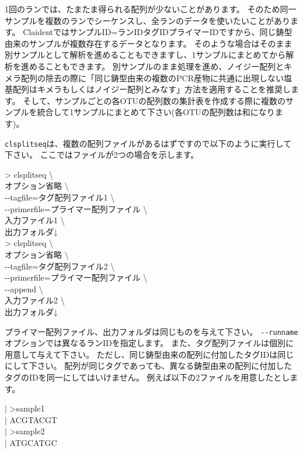 \documentclass[titlepage,10pt,a4paper]{jsbook}
\newenvironment{content}{\begin{shaded}\vspace{-1em}\raggedright\ttfamily\footnotesize\setlength{\baselineskip}{1.4em}}{\end{shaded}\vspace{-1em}}
\newenvironment{cmd}{\begin{oframed}\raggedright\ttfamily\footnotesize\setlength{\baselineskip}{1.4em}}{\end{oframed}\vspace{-1em}}
\begin{document}
1回のランでは、たまたま得られる配列が少ないことがあります。
そのため同一サンプルを複数のランでシーケンスし、全ランのデータを使いたいことがあります。
ClaidentではサンプルID=ランID{\textunderscore}{\textunderscore}タグID{\textunderscore}{\textunderscore}プライマーIDですから、同じ鋳型由来のサンプルが複数存在するデータとなります。
そのような場合はそのまま別サンプルとして解析を進めることもできますし、1サンプルにまとめてから解析を進めることもできます。
別サンプルのまま処理を進め、ノイジー配列とキメラ配列の除去の際に「同じ鋳型由来の複数のPCR産物に共通に出現しない塩基配列はキメラもしくはノイジー配列とみなす」方法を適用することを推奨します。
そして、サンプルごとの各OTUの配列数の集計表を作成する際に複数のサンプルを統合して1サンプルにまとめて下さい(各OTUの配列数は和になります)。

\texttt{clsplitseq}は、複数の配列ファイルがあるはずですので以下のように実行して下さい。
ここではファイルが2つの場合を示します。

\begin{cmd}
{\textgreater} clsplitseq {\textbackslash}\\
オプション省略 {\textbackslash}\\
{-}{-}tagfile=タグ配列ファイル1 {\textbackslash}\\
{-}{-}primerfile=プライマー配列ファイル {\textbackslash}\\
入力ファイル1 {\textbackslash}\\
出力フォルダ↓\\
{\textgreater} clsplitseq {\textbackslash}\\
オプション省略 {\textbackslash}\\
{-}{-}tagfile=タグ配列ファイル2 {\textbackslash}\\
{-}{-}primerfile=プライマー配列ファイル {\textbackslash}\\
{-}{-}append {\textbackslash}\\
入力ファイル2 {\textbackslash}\\
出力フォルダ↓
\end{cmd}

プライマー配列ファイル、出力フォルダは同じものを与えて下さい。
\texttt{{-}{-}runname}オプションでは異なるランIDを指定します。
また、タグ配列ファイルは個別に用意して与えて下さい。
ただし、同じ鋳型由来の配列に付加したタグIDは同じにして下さい。
配列が同じタグであっても、異なる鋳型由来の配列に付加したタグのIDを同一にしてはいけません。
例えば以下の2ファイルを用意したとします。

\begin{content}
| {\textgreater}sample1\\
| ACGTACGT\\
| {\textgreater}sample2\\
| ATGCATGC
\end{content}
\end{document}
